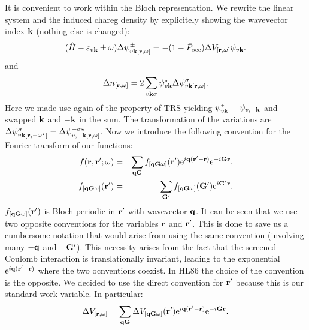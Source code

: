 \documentclass[twocolumn,prb,showpacs,superscriptaddress]{revtex4}
\def\w{\omega}
\def\H{\hat{H}}
\def\P{\hat{P}_{\rm occ}}
\def\E{\varepsilon}
\def\q{{\bf q}}
\def\s{\sigma}
\def\k{{\bf k}}
\def\G{{\bf G}}
\def\Gp{{\bf G^\prime}}
\def\r{{\bf r}}
\def\rp{{\bf r^\prime}}
\begin{document}
It is convenient to work within the Bloch representation. We rewrite the
linear system and the induced chareg density by explicitely showing the
wavevector index $\k$ (nothing else is changed):
  \begin{equation}
  (\H-\E_{v\k}\pm\w) \Delta \psi^\pm_{v\k[\r,\w]}  = -(1-\P)  \Delta V_{[\r,\w]} \psi_{v\k}.
  \end{equation}
and
  \begin{equation}
  \Delta n_{[\r,\w]} = 2\sum_{v\k\s} \psi_{v\k}^\star  \Delta \psi^\s_{v\k[\r,\w]}.
  \end{equation}
Here we made use again of the property of TRS yielding $\psi_{v\k}^\star=\psi_{v,-\k}$
and swapped $\k$ and $-\k$ in the sum.
The transformation of the variations are $\Delta \psi^\s_{v\k[\r,-\w^\star]}=\Delta \psi^{-\s\star}_{v,-\k[\r,\w]}$.
%
Now we introduce the following convention for the Fourier transform of our functions:
  \begin{eqnarray}
  f(\r,\rp;\w) & = & \sum_{\q\G} f_{[\q\G\w]}(\rp) {\rm e}^{i\q(\rp-\r)} {\rm e}^{-i\G\r}, \\
  f_{[\q\G\w]}(\rp) & = & \sum_\Gp f_{[\q\G\w]}(\Gp) {\rm e}^{i\Gp\r}.
  \end{eqnarray}
$f_{[\q\G\w]}(\rp)$ is Bloch-periodic in $\rp$ with wavevector $\q$.
It can be seen that we use two opposite conventions for the variables $\r$ and $\rp$.
This is done to save us a cumbersome notation that would arise from using the same
convention (involving many $-\q$ and $-\Gp$). This necessity arises from the fact
that the screened Coulomb interaction is translationally invariant, leading to 
the exponential ${\rm e}^{i\q(\rp-\r)}$ where the two ocnventions coexist.
In HL86 the choice of the convention is the opposite. We decided to use the
direct convention for $\rp$ because this is our standard work variable.
In particular:
  \begin{equation}
  \Delta V_{[\r,\w]} = \sum_{\q\G} \Delta V_{[\q\G\w]}(\rp) {\rm e}^{i\q(\rp-\r)} {\rm e}^{-i\G\r}.
  \end{equation}
\end{document}

